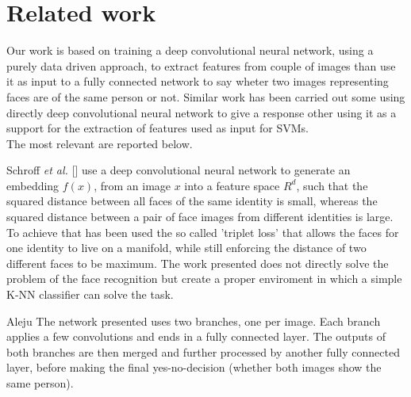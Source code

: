 \section{Related work}
Our work is based on training a deep convolutional neural network, using a purely data driven approach, to extract features from couple of images than use it as input to a fully connected network to say wheter two images representing faces are of the same person or not.
Similar work has been carried out some using directly deep convolutional neural network to give a response other using it as a support for the extraction of features used as input for SVMs.
\\
The most relevant are reported below.
\\
\par
Schroff \textit{et al.} [] use a deep convolutional neural network to generate an embedding $f(x)$, from an image $x$ into a feature space $R^d$, such that the squared distance between all faces of the same identity is small, whereas the squared distance between a pair of face images from different identities is large. To achieve that has been used the so called 'triplet loss' that allows the faces for one identity to live on a manifold, while still enforcing the distance of two different faces to be maximum.
The work presented does not directly solve the problem of the face recognition but create a proper enviroment in which a simple K-NN classifier can solve the task.
\\
\par
Aleju \cite{aleju} The network presented uses two branches, one per image. Each branch applies a few convolutions and ends in a fully connected layer. The outputs of both branches are then merged and further processed by another fully connected layer, before making the final yes-no-decision (whether both images show the same person).
